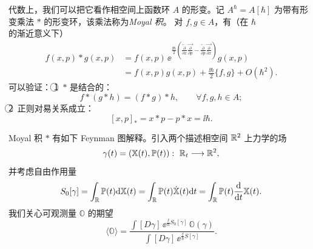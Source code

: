 

代数上，我们可以把它看作相空间上函数环 $A$ 的形变。记
$A^{\hbar}=A[\hbar]$ 为带有形变乘法 $*$ 的形变环，该乘法称为\emph{Moyal 积}。
对 $f,g\in A$，有（在 $\hbar$ 的渐近意义下）
\[
  \begin{aligned}
    f(x,p)*g(x,p)
    &=f(x,p)\,\ee^{\frac{\ii\hbar}{2}\left(
        \overleftarrow{\frac{\partial}{\partial x}}
        \overrightarrow{\frac{\partial}{\partial p}}
        -\overleftarrow{\frac{\partial}{\partial p}}
        \overrightarrow{\frac{\partial}{\partial x}}
      \right)}g(x,p)\\
    &=f(x,p)g(x,p)+\frac{\ii\hbar}{2}\{f,g\}+O(\hbar^2).
  \end{aligned}
\]
可以验证：
\textcircled{1}\ $*$ 是结合的：
\[
  f*(g*h)=(f*g)*h,\qquad \forall f,g,h\in A;
\]
\textcircled{2}\ 正则对易关系成立：
\[
  [x,p]_*=x*p-p*x=\ii\hbar.
\]


Moyal 积 $*$ 有如下 Feynman 图解释。引入两个描述相空间 $\mathbb{R}^2$ 上力学的场
\[
  \gamma(t)=\left(\mathbb{X}(t),\mathbb{P}(t)\right):\ \R_t\longrightarrow\R^2,
\]
并考虑自由作用量
\[
  S_0[\gamma]=\int_{\mathbb{R}}\mathbb{P}(t)\mathrm{d}\mathbb{X}(t)
  =\int_{\mathbb{R}}\mathbb{P}(t)\dot{\mathbb{X}}(t)\mathrm{d} t
  =\int_{\mathbb{R}}\mathbb{P}(t)\frac{\mathrm{d}}{\mathrm{d} t}\mathbb{X}(t).
\]
我们关心可观测量 $\mathbb{O}$ 的期望
\[
  \langle\mathbb{O}\rangle
  =\frac{\int[D\gamma]\,\ee^{\frac{\ii}{\hbar}S_0[\gamma]}\,\mathbb{O}(\gamma)}
        {\int[D\gamma]\,\ee^{\frac{\ii}{\hbar}S[\gamma]}}.
\]

